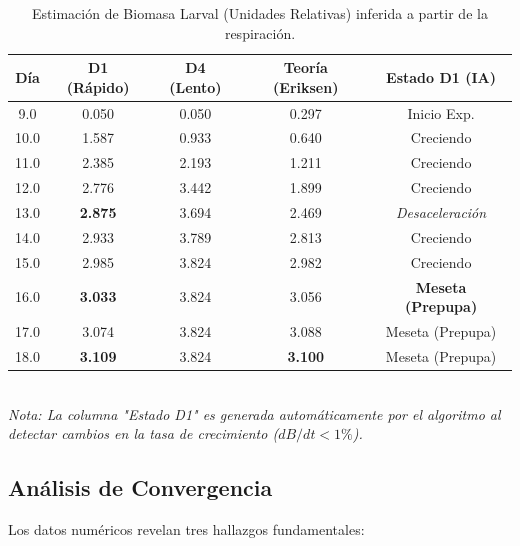 \begin{table}[h!]
    \centering
    \caption{Estimación de Biomasa Larval (Unidades Relativas) inferida a partir de la respiración.}
    \label{tab:sensor_virtual}
    \begin{tabular}{c|cc|c|c}
        \hline
        \textbf{Día} & \textbf{D1 (Rápido)} & \textbf{D4 (Lento)} & \textbf{Teoría (Eriksen)} & \textbf{Estado D1 (IA)} \\ \hline
        9.0  & 0.050 & 0.050 & 0.297 & Inicio Exp. \\
        10.0 & 1.587 & 0.933 & 0.640 & Creciendo \\
        11.0 & 2.385 & 2.193 & 1.211 & Creciendo \\
        12.0 & 2.776 & 3.442 & 1.899 & Creciendo \\
        13.0 & \textbf{2.875} & 3.694 & 2.469 & \textit{Desaceleración} \\
        14.0 & 2.933 & 3.789 & 2.813 & Creciendo \\
        15.0 & 2.985 & 3.824 & 2.982 & Creciendo \\
        16.0 & \textbf{3.033} & 3.824 & 3.056 & \textbf{Meseta (Prepupa)} \\
        17.0 & 3.074 & 3.824 & 3.088 & Meseta (Prepupa) \\
        18.0 & \textbf{3.109} & 3.824 & \textbf{3.100} & Meseta (Prepupa) \\ \hline
    \end{tabular}
    \small{\\ \textit{Nota: La columna "Estado D1" es generada automáticamente por el algoritmo al detectar cambios en la tasa de crecimiento ($dB/dt < 1\%$).}}
\end{table}

\subsection{Análisis de Convergencia}

Los datos numéricos revelan tres hallazgos fundamentales:

